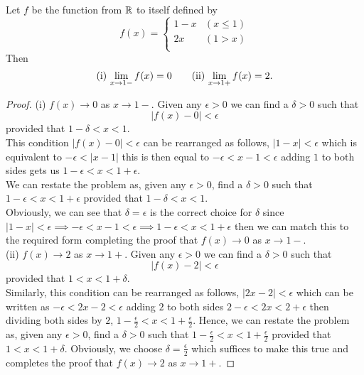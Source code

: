 \documentclass[10pt, a4paper]{article}
\begin{document}
\begin{example}
    Let $f$ be the function from $\mathbb{R}$ to itself defined by
    \[ f(x) = \begin{cases}
        1 - x & (x \leq 1) \\
        2x & (1 > x) \\
    \end{cases} \]
    Then 
    \[\textnormal{(i)}\,\lim_{x \rightarrow 1-}{f(x)} = 0\qquad\textnormal{(ii)}\,\lim_{x \rightarrow 1+}{f(x)} = 2.\]
    \begin{proof}
        \textnormal{(i)} $f(x) \rightarrow 0$ as $x \rightarrow 1-$. Given any $\epsilon > 0$ we can find a $\delta > 0$ such that $$|f(x) - 0| < \epsilon$$
        provided that $1 - \delta < x < 1$. \\
        This condition $|f(x) - 0| < \epsilon$ can be rearranged as follows, $|1 - x| < \epsilon$ which is equivalent to $-\epsilon < |x - 1|$ this is then equal to $-\epsilon < x - 1 < \epsilon$ adding $1$ to both sides gets us $1 - \epsilon < x < 1 + \epsilon$. \\
        We can restate the problem as, given any $\epsilon > 0$, find a $\delta > 0$ such that $1 - \epsilon < x < 1 + \epsilon$ provided that $1 - \delta < x < 1$. \\
        Obviously, we can see that $\delta = \epsilon$ is the correct choice for $\delta$ since $|1 - x| < \epsilon \implies -\epsilon < x - 1 < \epsilon \implies 1 - \epsilon < x < 1 + \epsilon$ then we can match this to the required form completing the proof that $f(x) \rightarrow 0$ as $x \rightarrow 1-$. \\
        \textnormal{(ii)} $f(x) \rightarrow 2$ as $x \rightarrow 1+$. Given any $\epsilon > 0$ we can find a $\delta > 0$ such that $$|f(x) - 2| < \epsilon$$
        provided that $1 < x < 1 + \delta$. \\
        Similarly, this condition can be rearranged as follows, $|2x - 2| < \epsilon$ which can be written as $-\epsilon < 2x - 2 < \epsilon$ adding $2$ to both sides $2 - \epsilon < 2x < 2 + \epsilon$ then dividing both sides by $2$, $1 - \frac{\epsilon}{2} < x < 1 + \frac{\epsilon}{2}$. Hence, we can restate the problem as, given any $\epsilon > 0$, find a $\delta > 0$ such that $1 - \frac{\epsilon}{2} < x < 1 + \frac{\epsilon}{2}$ provided that $1 < x < 1 + \delta$. Obviously, we choose $\delta = \frac{\epsilon}{2}$ which suffices to make this true and completes the proof that $f(x) \rightarrow 2$ as $x \rightarrow 1+$.
    \end{proof}
\end{example}
\end{document}
